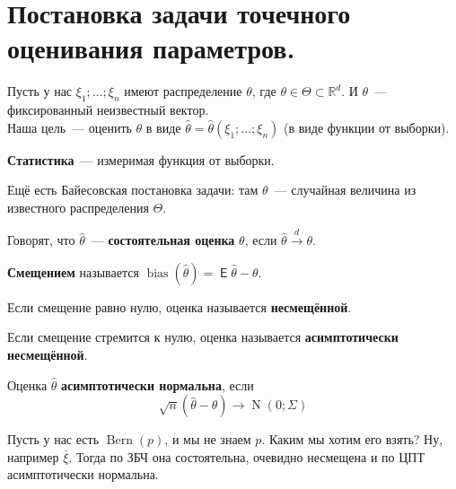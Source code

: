 \documentclass{article}
\DeclareMathOperator{\Expected}{\mathsf{E}}
\begin{document}
    \section{Постановка задачи точечного оценивания параметров.}
    \begin{remark}
        Пусть у нас $\xi_1;\ldots;\xi_n$ имеют распределение $\theta$, где $\theta\in\Theta\subset\mathbb R^{d}$. И $\theta$~--- фиксированный неизвестный вектор.\\
        Наша цель~--- оценить $\theta$ в виде $\widehat{\theta}=\widehat{\theta}(\xi_1;\ldots;\xi_n)$ (в виде функции от выборки).
    \end{remark}
    \begin{definition}
        \textbf{Статистика}~--- измеримая функция от выборки.
    \end{definition}
    \begin{remark}
        Ещё есть Байесовская постановка задачи: там $\theta$~--- случайная величина из известного распределения $\Theta$.
    \end{remark}
    \begin{definition}
        Говорят, что $\widehat{\theta}$~--- \textbf{состоятельная оценка} $\theta$, если $\widehat{\theta}\overset d\longrightarrow\theta$.
    \end{definition}
    \begin{definition}
        \textbf{Смещением} называется $\operatorname{bias}(\widehat\theta)=\Expected\widehat{\theta}-\theta$.
    \end{definition}
    \begin{definition}
        Если смещение равно нулю, оценка называется \textbf{несмещённой}.
    \end{definition}
    \begin{definition}
        Если смещение стремится к нулю, оценка называется \textbf{асимптотически несмещённой}.
    \end{definition}
    \begin{definition}
        Оценка $\widehat\theta$ \textbf{асимптотически нормальна}, если
        \[
        \sqrt n(\widehat{\theta}-\theta)\rightarrow\operatorname{N}(0;\Sigma)
        \]
    \end{definition}
    \begin{example}
        Пусть у нас есть $\operatorname{Bern}(p)$, и мы не знаем $p$. Каким мы хотим его взять? Ну, например $\overline\xi$. Тогда по ЗБЧ она состоятельна, очевидно несмещена и по ЦПТ асимптотически нормальна.
    \end{example}
\end{document}
